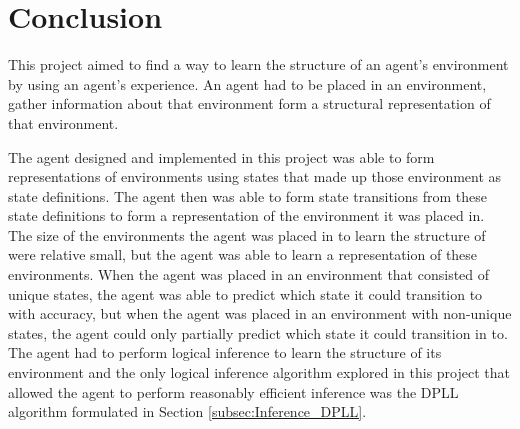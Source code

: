 






\chapter{Conclusion}
\label{chapter: Conclusion and Recommendations} 


This project aimed to find a way to learn the structure of an agent's environment by using an agent's experience.
An agent had to be placed in an environment, gather information about that environment form a structural representation of that environment.


The agent designed and implemented in this project was able to form representations of environments using states that made up those environment as state definitions. The agent then was able to form state transitions from these state definitions to form a representation of the environment it was placed in. The size of the environments the agent was placed in to learn the structure of were relative small, but the agent was able to learn a representation of these environments. When the agent was placed in an environment that consisted of unique states, the agent was able to predict which state it could transition to with accuracy, but when the agent was placed in an environment with non-unique states, the agent could only partially predict which state it could transition in to. The agent had to perform logical inference to learn the structure of its environment and the only logical inference algorithm explored in this project that allowed the agent to perform reasonably efficient inference was the DPLL algorithm formulated in Section \ref{subsec:Inference_DPLL}.


